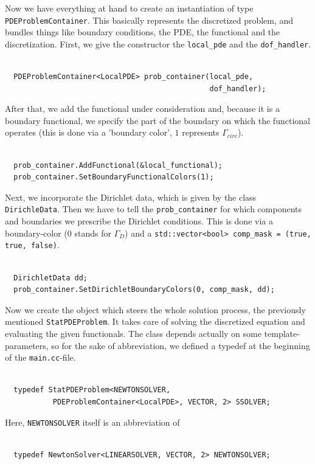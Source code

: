 \documentclass[prodmode,acmtoms]{acmsmall}
\numberwithin{equation}{section}
\begin{document}
Now we have everything at hand to create an instantiation of type \texttt{PDEProblemContainer}. This basically represents the discretized problem, and bundles things like boundary conditions, the PDE, the functional and the discretization. First, we give the constructor the \texttt{local\_pde} and the \texttt{dof\_handler}.
\begin{lstlisting}

  PDEProblemContainer<LocalPDE> prob_container(local_pde,
                                               dof_handler);
\end{lstlisting}
After that, we add the functional under consideration and, because it is a boundary functional, we specify the part of the boundary on which the functional operates (this is done via a 'boundary color', $1$ represents $\Gamma_{circ}$).
\begin{lstlisting}

  prob_container.AddFunctional(&local_functional);
  prob_container.SetBoundaryFunctionalColors(1);

\end{lstlisting}
Next, we incorporate the Dirichlet data, which is given by the class \texttt{DirichleData}. Then we have to tell the \texttt{prob\_container} for which components and boundaries we prescribe the Dirichlet conditions. This is done via a boundary-color (0 stands for $\Gamma_D$) and a \texttt{std::vector<bool> comp\_mask = (true, true, false)}.
\begin{lstlisting}

  DirichletData dd;
  prob_container.SetDirichletBoundaryColors(0, comp_mask, dd);

\end{lstlisting}
Now we create the object which steers the whole solution process, the previously mentioned \texttt{StatPDEProblem}. It takes care of solving the discretized equation and evaluating the given functionals. The class depends actually on some template-parameters, so for the sake of abbreviation, we defined a typedef at the beginning of the \texttt{main.cc}-file.
\begin{lstlisting}

  typedef StatPDEProblem<NEWTONSOLVER,
           PDEProblemContainer<LocalPDE>, VECTOR, 2> SSOLVER;

\end{lstlisting}
Here, \texttt{NEWTONSOLVER} itself is an abbreviation of
\begin{lstlisting}
  
  typedef NewtonSolver<LINEARSOLVER, VECTOR, 2> NEWTONSOLVER;

\end{lstlisting}
\end{document}
